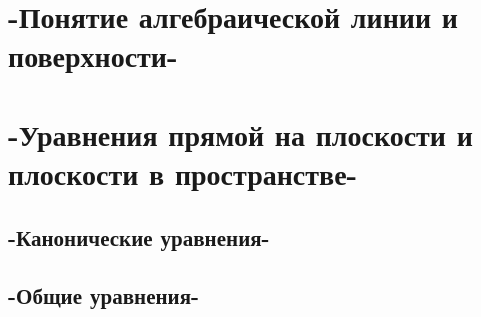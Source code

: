 \chapter{-Понятие алгебраической линии и поверхности-}
\chapter{-Уравнения прямой на плоскости и плоскости в пространстве-}
\section{-Канонические уравнения-}
\section{-Общие уравнения-}
